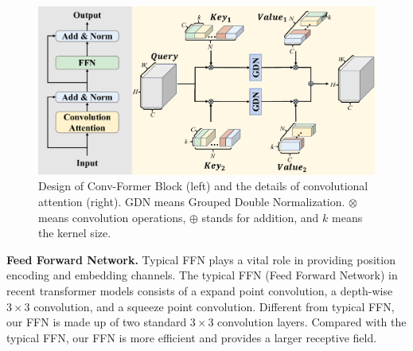 \documentclass[letterpaper]{article} %
\begin{document}
\begin{figure}
  \begin{center}
     \includegraphics[width=\linewidth]{image/figure4_ConvFormerBlock.pdf}
  \end{center}
     \caption{Design of Conv-Former Block (left) and the details of convolutional attention (right). GDN means Grouped Double Normalization. $\otimes$ means convolution operations, $\oplus$ stands for addition, and $k$ means the kernel size.}
  \label{fig:figure4_ConvFormerBlock}
  \vspace{-10pt}
  \end{figure}

\noindent
{\bf Feed Forward Network.} 
Typical FFN plays a vital role in providing position encoding and embedding channels. The typical FFN (Feed Forward Network) in recent transformer models consists of a expand point convolution, a depth-wise $3 \times 3$ convolution, and a squeeze point convolution. Different from typical FFN, our FFN is made up of two standard $3 \times 3$ convolution layers. Compared with the typical FFN, our FFN is more efficient and provides a larger receptive field.
\end{document}
